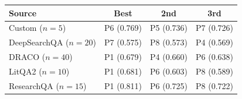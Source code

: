 \begin{tabular}{lccc}
\toprule
Source & Best & 2nd & 3rd\\
\midrule
Custom ($n{=}5$) & P6 (0.769) & P5 (0.736) & P7 (0.726) \\
DeepSearchQA ($n{=}20$) & P7 (0.575) & P8 (0.573) & P4 (0.569) \\
DRACO ($n{=}40$) & P1 (0.679) & P4 (0.660) & P6 (0.638) \\
LitQA2 ($n{=}10$) & P1 (0.681) & P6 (0.603) & P8 (0.589) \\
ResearchQA ($n{=}15$) & P1 (0.811) & P6 (0.725) & P8 (0.722) \\
\bottomrule
\end{tabular}